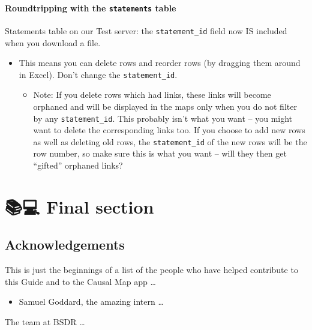 \documentclass[
]{book}
\providecommand{\tightlist}{%
  \setlength{\itemsep}{0pt}\setlength{\parskip}{0pt}}
\begin{document}
\hypertarget{roundtripping-with-the-statements-table}{%
\subsection{\texorpdfstring{Roundtripping with the \texttt{statements} table}{Roundtripping with the statements table}}\label{roundtripping-with-the-statements-table}}

Statements table on our Test server: the \texttt{statement\_id} field now IS included when you download a file.

\begin{itemize}
\tightlist
\item
  This means you can delete rows and reorder rows (by dragging them around in Excel). Don't change the \texttt{statement\_id}.

  \begin{itemize}
  \tightlist
  \item
    Note: If you delete rows which had links, these links will become orphaned and will be displayed in the maps only when you do not filter by any \texttt{statement\_id}. This probably isn't what you want -- you might want to delete the corresponding links too. If you choose to add new rows as well as deleting old rows, the \texttt{statement\_id} of the new rows will be the row number, so make sure this is what you want -- will they then get ``gifted'' orphaned links?
  \end{itemize}
\end{itemize}

\hypertarget{part-final-section}{%
\part{📚💻 Final section}\label{part-final-section}}

\hypertarget{acknowledgements}{%
\chapter{Acknowledgements}\label{acknowledgements}}

This is just the beginnings of a list of the people who have helped contribute to this Guide and to the Causal Map app \ldots{}

\begin{itemize}
\tightlist
\item
  Samuel Goddard, the amazing intern \ldots{}
\end{itemize}

The team at BSDR \ldots{}
\end{document}
